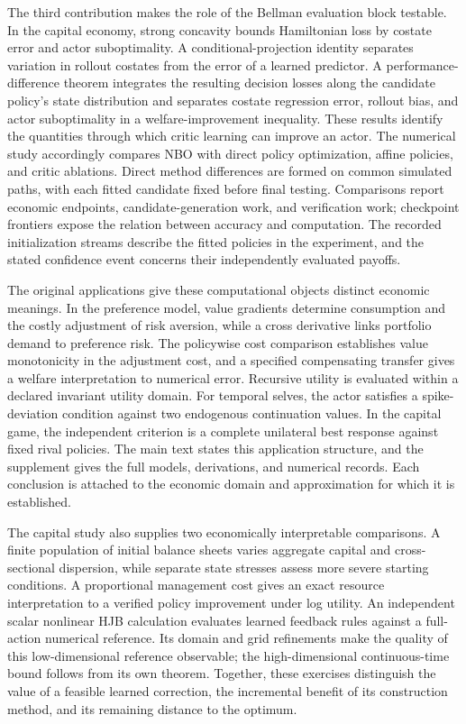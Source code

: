 \documentclass[ecta,nameyear,draft]{econsocart}
\theoremstyle{definition}
\theoremstyle{remark}
\begin{document}
The third contribution makes the role of the Bellman evaluation block testable. In the capital economy, strong concavity bounds Hamiltonian loss by costate error and actor suboptimality. A conditional-projection identity separates variation in rollout costates from the error of a learned predictor. A performance-difference theorem integrates the resulting decision losses along the candidate policy's state distribution and separates costate regression error, rollout bias, and actor suboptimality in a welfare-improvement inequality. These results identify the quantities through which critic learning can improve an actor. The numerical study accordingly compares NBO with direct policy optimization, affine policies, and critic ablations. Direct method differences are formed on common simulated paths, with each fitted candidate fixed before final testing. Comparisons report economic endpoints, candidate-generation work, and verification work; checkpoint frontiers expose the relation between accuracy and computation. The recorded initialization streams describe the fitted policies in the experiment, and the stated confidence event concerns their independently evaluated payoffs.

The original applications give these computational objects distinct economic meanings. In the preference model, value gradients determine consumption and the costly adjustment of risk aversion, while a cross derivative links portfolio demand to preference risk. The policywise cost comparison establishes value monotonicity in the adjustment cost, and a specified compensating transfer gives a welfare interpretation to numerical error. Recursive utility is evaluated within a declared invariant utility domain. For temporal selves, the actor satisfies a spike-deviation condition against two endogenous continuation values. In the capital game, the independent criterion is a complete unilateral best response against fixed rival policies. The main text states this application structure, and the supplement gives the full models, derivations, and numerical records. Each conclusion is attached to the economic domain and approximation for which it is established.

The capital study also supplies two economically interpretable comparisons. A finite population of initial balance sheets varies aggregate capital and cross-sectional dispersion, while separate state stresses assess more severe starting conditions. A proportional management cost gives an exact resource interpretation to a verified policy improvement under log utility. An independent scalar nonlinear HJB calculation evaluates learned feedback rules against a full-action numerical reference. Its domain and grid refinements make the quality of this low-dimensional reference observable; the high-dimensional continuous-time bound follows from its own theorem. Together, these exercises distinguish the value of a feasible learned correction, the incremental benefit of its construction method, and its remaining distance to the optimum.
\end{document}
